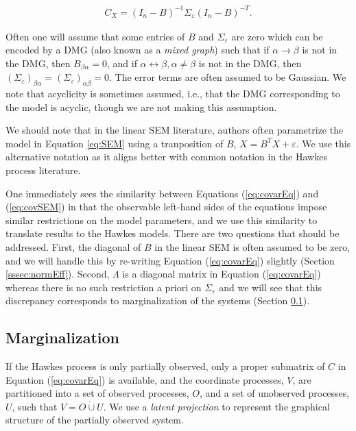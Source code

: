\documentclass[accepted]{uai2021} %
\newcommand{\disjU}{\mathbin{\dot{\cup}}}
\begin{document}
\begin{align}
C_X = (I_n - B)^{-1}\Sigma_\varepsilon (I_n - B)^{-T}.
\label{eq:covSEM}
\end{align}

Often one will assume that some entries of $B$ and 
$\Sigma_\varepsilon$ are zero which can be encoded by a DMG (also known as a 
\emph{mixed graph}) such that if 
$\alpha \rightarrow \beta$ is not in the DMG, then $B_{\beta\alpha} = 0$, and 
if
$\alpha\leftrightarrow\beta, \alpha\neq \beta$ is not in the DMG, then 
$(\Sigma_\varepsilon)_{\beta\alpha} = (\Sigma_\varepsilon)_{\alpha\beta} = 0$. 
The 
error terms are often assumed to be Gaussian. We note that acyclicity is 
sometimes assumed, 
i.e., that the DMG corresponding to the model is 
acyclic, though we are not making 
this assumption.

We should note that in the linear SEM literature, authors often parametrize 
the model in Equation \ref{eq:SEM} using a 
tranposition of $B$, $X = B^TX + \varepsilon$. We use this alternative notation 
as it 
aligns better with common 
notation 
in the Hawkes process literature.

One immediately sees the similarity between Equations (\ref{eq:covarEq}) 
and (\ref{eq:covSEM}) in that the observable left-hand sides of the equations 
impose similar restrictions on the model parameters, and we use 
this similarity to translate results to the Hawkes models. There are two 
questions that should be addressed. First, the diagonal of $B$ in 
the linear SEM is often assumed to be zero, and we will handle this by 
re-writing 
Equation (\ref{eq:covarEq}) slightly (Section \ref{sssec:normEff}). Second, 
$\Lambda$ 
is a diagonal matrix in Equation (\ref{eq:covarEq}) whereas there is no such 
restriction 
a priori on $\Sigma_\varepsilon$ and we will see that this discrepancy 
corresponds to marginalization of the systems (Section \ref{sssec:marg}).




\subsection{Marginalization}
\label{sssec:marg} 

If the Hawkes process is only partially observed, only a proper submatrix of 
$C$ in Equation (\ref{eq:covarEq}) is available, and the coordinate processes, 
$V$, are partitioned into a set of observed processes, $O$, and a set of 
unobserved processes, $U$, such that $V = O\disjU U$. We use a \emph{latent 
projection} to represent the graphical structure of the partially observed 
system.
\end{document}
